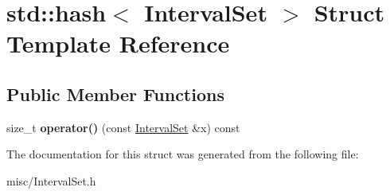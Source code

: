 \hypertarget{structstd_1_1hash_3_01IntervalSet_01_4}{}\section{std\+:\+:hash$<$ Interval\+Set $>$ Struct Template Reference}
\label{structstd_1_1hash_3_01IntervalSet_01_4}
\subsection*{Public Member Functions}
\begin{DoxyCompactItemize}
\item 
\mbox{\label{structstd_1_1hash_3_01IntervalSet_01_4_a0f95e3249d4523142ac0d7e15ed91e3d}} 
size\+\_\+t {\bfseries operator()} (const \hyperlink{classantlr4_1_1misc_1_1IntervalSet}{Interval\+Set} \&x) const
\end{DoxyCompactItemize}


The documentation for this struct was generated from the following file\+:\begin{DoxyCompactItemize}
\item 
misc/Interval\+Set.\+h\end{DoxyCompactItemize}

